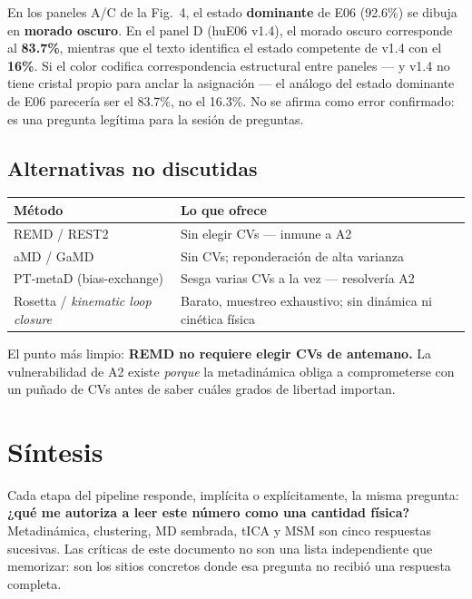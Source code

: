 \documentclass[11pt]{article}
\begin{document}
\begin{aviso}
En los paneles A/C de la Fig.\ 4, el estado \textbf{dominante} de E06 (92.6\%) se dibuja en \textbf{morado oscuro}. En el panel D (huE06 v1.4), el morado oscuro corresponde al \textbf{83.7\%}, mientras que el texto identifica el estado competente de v1.4 con el \textbf{16\%}. Si el color codifica correspondencia estructural entre paneles --- y v1.4 no tiene cristal propio para anclar la asignación --- el análogo del estado dominante de E06 parecería ser el 83.7\%, no el 16.3\%. No se afirma como error confirmado: es una pregunta legítima para la sesión de preguntas.
\end{aviso}

\subsection{Alternativas no discutidas}
\begin{center}
\small
\begin{tabular}{lp{8cm}}
\toprule
Método & Lo que ofrece \\
\midrule
REMD / REST2 & Sin elegir CVs --- inmune a A2 \\
aMD / GaMD & Sin CVs; reponderación de alta varianza \\
PT-metaD (bias-exchange) & Sesga varias CVs a la vez --- resolvería A2 \\
Rosetta / \textit{kinematic loop closure} & Barato, muestreo exhaustivo; sin dinámica ni cinética física \\
\bottomrule
\end{tabular}
\end{center}
El punto más limpio: \textbf{REMD no requiere elegir CVs de antemano.} La vulnerabilidad de A2 existe \emph{porque} la metadinámica obliga a comprometerse con un puñado de CVs antes de saber cuáles grados de libertad importan.

\section*{Síntesis}

Cada etapa del pipeline responde, implícita o explícitamente, la misma pregunta: \textbf{¿qué me autoriza a leer este número como una cantidad física?} Metadinámica, clustering, MD sembrada, tICA y MSM son cinco respuestas sucesivas. Las críticas de este documento no son una lista independiente que memorizar: son los sitios concretos donde esa pregunta no recibió una respuesta completa.
\end{document}
